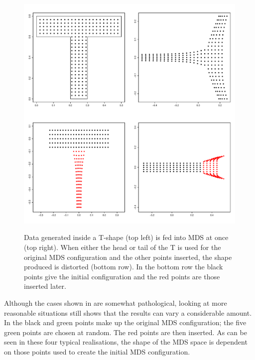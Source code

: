 \begin{figure}
\centering
\includegraphics[width=6in]{mds/figs/tshape.pdf} \\
\caption{Data generated inside a T-shape (top left) is fed into MDS at once (top right). When either the head or tail of the T is used for the original MDS configuration and the other points inserted, the shape produced is distorted (bottom row). In the bottom row the black points give the initial configuration and the red points are those inserted later.}
\label{tshape}
\end{figure}

Although the cases shown in  are somewhat pathological, looking at more reasonable situations still shows that the results can vary a considerable amount. In  the black and green points make up the original MDS configuration; the five green points are chosen at random. The red points are then inserted. As can be seen in these four typical realisations, the shape of the MDS space is dependent on those points used to create the initial MDS configuration.


